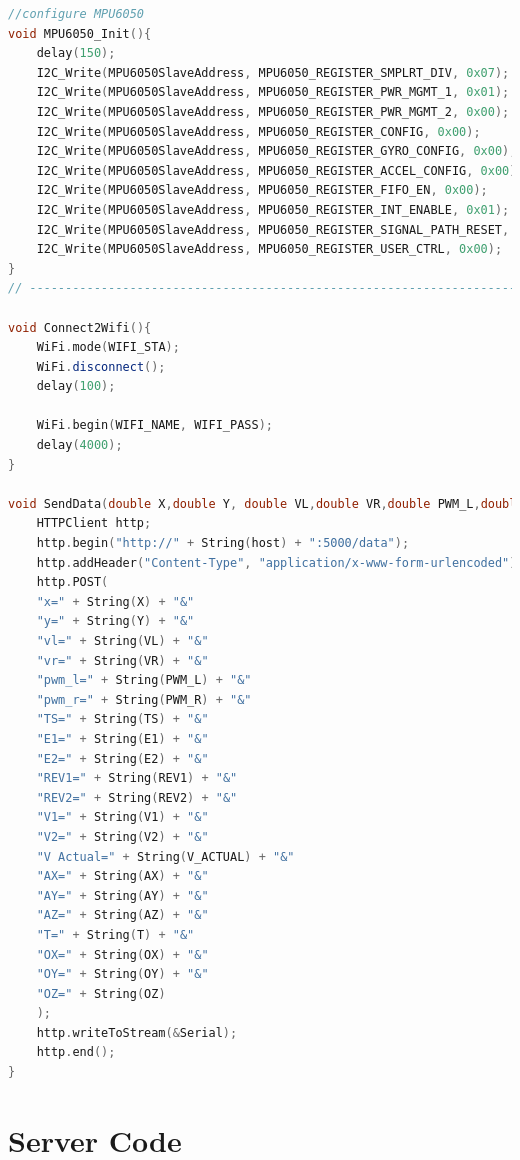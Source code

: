 \documentclass[conference]{IEEEtran}
\begin{document}
\begin{lstlisting}[language=C++, caption=Robot Code]
//configure MPU6050
void MPU6050_Init(){
    delay(150);
    I2C_Write(MPU6050SlaveAddress, MPU6050_REGISTER_SMPLRT_DIV, 0x07);
    I2C_Write(MPU6050SlaveAddress, MPU6050_REGISTER_PWR_MGMT_1, 0x01);
    I2C_Write(MPU6050SlaveAddress, MPU6050_REGISTER_PWR_MGMT_2, 0x00);
    I2C_Write(MPU6050SlaveAddress, MPU6050_REGISTER_CONFIG, 0x00);
    I2C_Write(MPU6050SlaveAddress, MPU6050_REGISTER_GYRO_CONFIG, 0x00);//set +/-250 degree/second full scale
    I2C_Write(MPU6050SlaveAddress, MPU6050_REGISTER_ACCEL_CONFIG, 0x00);// set +/- 2g full scale
    I2C_Write(MPU6050SlaveAddress, MPU6050_REGISTER_FIFO_EN, 0x00);
    I2C_Write(MPU6050SlaveAddress, MPU6050_REGISTER_INT_ENABLE, 0x01);
    I2C_Write(MPU6050SlaveAddress, MPU6050_REGISTER_SIGNAL_PATH_RESET, 0x00);
    I2C_Write(MPU6050SlaveAddress, MPU6050_REGISTER_USER_CTRL, 0x00);
}
// --------------------------------------------------------------------------------

void Connect2Wifi(){
    WiFi.mode(WIFI_STA);
    WiFi.disconnect();
    delay(100);

    WiFi.begin(WIFI_NAME, WIFI_PASS);
    delay(4000);
}

void SendData(double X,double Y, double VL,double VR,double PWM_L,double PWM_R,double TS, double E1, double E2, double REV1, double REV2, double V1, double V2, double V_ACTUAL, double AX, double AY, double AZ, double T, double OX, double OY, double OZ){
    HTTPClient http;
    http.begin("http://" + String(host) + ":5000/data");
    http.addHeader("Content-Type", "application/x-www-form-urlencoded");
    http.POST(
    "x=" + String(X) + "&"
    "y=" + String(Y) + "&"
    "vl=" + String(VL) + "&"
    "vr=" + String(VR) + "&"
    "pwm_l=" + String(PWM_L) + "&"
    "pwm_r=" + String(PWM_R) + "&"
    "TS=" + String(TS) + "&"
    "E1=" + String(E1) + "&"
    "E2=" + String(E2) + "&"
    "REV1=" + String(REV1) + "&"
    "REV2=" + String(REV2) + "&"
    "V1=" + String(V1) + "&"
    "V2=" + String(V2) + "&"
    "V Actual=" + String(V_ACTUAL) + "&"
    "AX=" + String(AX) + "&"
    "AY=" + String(AY) + "&"
    "AZ=" + String(AZ) + "&"
    "T=" + String(T) + "&"
    "OX=" + String(OX) + "&"
    "OY=" + String(OY) + "&"
    "OZ=" + String(OZ)
    );
    http.writeToStream(&Serial);
    http.end();
}\end{lstlisting}

\section{Server Code}
\end{document}

